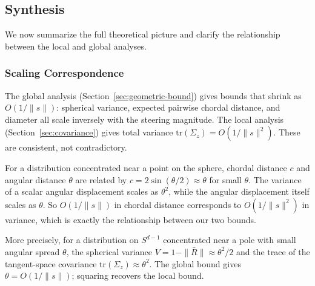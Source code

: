%
%
%
%
%

\subsection{Synthesis}
\label{sec:synthesis}

We now summarize the full theoretical picture and clarify the relationship
between the local and global analyses.

\subsubsection{Scaling Correspondence}

The global analysis (Section~\ref{sec:geometric-bound}) gives bounds
that shrink as $O(1/\|s\|)$: spherical variance, expected pairwise
chordal distance, and diameter all scale inversely with the steering
magnitude.
The local analysis (Section~\ref{sec:covariance}) gives total variance
$\mathrm{tr}(\Sigma_z) = O(1/\|s\|^2)$.
These are consistent, not contradictory.

For a distribution concentrated near a point on the sphere, chordal
distance $c$ and angular distance $\theta$ are related by
$c = 2\sin(\theta/2) \approx \theta$ for small $\theta$.
The variance of a scalar angular displacement scales as $\theta^2$,
while the angular displacement itself scales as $\theta$.
So $O(1/\|s\|)$ in chordal distance corresponds to $O(1/\|s\|^2)$
in variance, which is exactly the relationship between our two bounds.

More precisely, for a distribution on $S^{d-1}$ concentrated near a
pole with small angular spread $\theta$, the spherical variance
$V = 1 - \|\bar{R}\| \approx \theta^2/2$ and the trace of the
tangent-space covariance $\mathrm{tr}(\Sigma_z) \approx \theta^2$.
The global bound gives $\theta = O(1/\|s\|)$; squaring recovers the
local bound.

